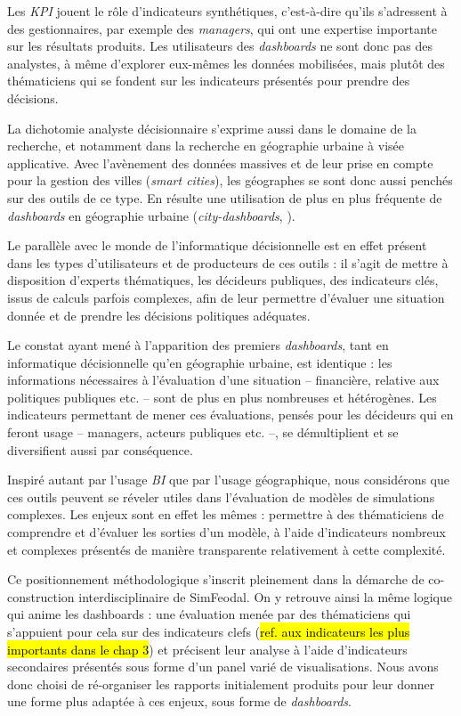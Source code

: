 	Les \textit{KPI} jouent le rôle d'indicateurs synthétiques, c'est-à-dire qu'ils s'adressent à des gestionnaires, par exemple des \textit{managers}, qui ont une expertise importante sur les résultats produits.
	Les utilisateurs des \textit{dashboards} ne sont donc pas des analystes, à même d'explorer eux-mêmes les données mobilisées, mais plutôt des thématiciens qui se fondent sur les indicateurs présentés pour prendre des décisions.

	La dichotomie \og analyste décisionnaire\fg{} s'exprime aussi dans le domaine de la recherche, et notamment dans la recherche en géographie urbaine à visée applicative.
	Avec l'avènement des données massives et de leur prise en compte pour la gestion des villes (\textit{smart cities}), les géographes se sont donc aussi penchés sur des outils de ce type.
	En résulte une utilisation de plus en plus fréquente de \textit{dashboards} en géographie urbaine (\og \textit{city-dashboards}\fg{}, \cite{roumpani_creating_2013, kitchin_knowing_2015, batty_perspective_2015}).

	Le parallèle avec le monde de l'informatique décisionnelle est en effet présent dans les types d'utilisateurs et de producteurs de ces outils : il s'agit de mettre à disposition d'experts thématiques, les décideurs publiques, des indicateurs clés, issus de calculs parfois complexes, afin de leur permettre d'évaluer une situation donnée et de prendre les décisions politiques adéquates.

	Le constat ayant mené à l'apparition des premiers \textit{dashboards}, tant en informatique décisionnelle qu'en géographie urbaine, est identique : les informations nécessaires à l'évaluation d'une situation -- financière, relative aux politiques publiques etc. -- sont de plus en plus nombreuses et hétérogènes.
	Les indicateurs permettant de mener ces évaluations, pensés pour les décideurs qui en feront usage -- managers, acteurs publiques etc. --, se démultiplient et se diversifient aussi par conséquence.

	Inspiré autant par l'usage \textit{BI} que par l'usage géographique, nous considérons que ces outils peuvent se réveler utiles dans l'évaluation de modèles de simulations complexes.
	Les enjeux sont en effet les mêmes : permettre à des thématiciens de comprendre et d'évaluer les sorties d'un modèle, à l'aide d'indicateurs nombreux et complexes présentés de manière transparente relativement à cette complexité.

	Ce positionnement méthodologique s'inscrit pleinement dans la démarche de co-construction interdisciplinaire de SimFeodal.
	On y retrouve ainsi la même logique qui anime les dashboards : une évaluation menée par des thématiciens qui s'appuient pour cela sur des indicateurs clefs (\hl{ref. aux indicateurs les plus importants dans le chap 3}) et précisent leur analyse à l'aide d'indicateurs secondaires présentés sous forme d'un panel varié de visualisations.
	Nous avons donc choisi de ré-organiser les rapports initialement produits pour leur donner une forme plus adaptée à ces enjeux, sous forme de \textit{dashboards}.

